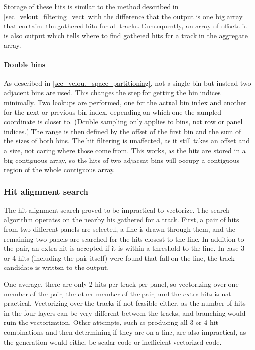 \documentclass[12pt]{article}
\begin{document}
Storage of these hits is similar to the method described in \ref{sec_velout_filtering_vect} with the difference that the output is one big array that contains the gathered hits for all tracks. Consequently, an array of offsets is is also output which tells where to find gathered hits for a track in the aggregate array.

\paragraph{Double bins}\mbox{}\vspace{0.4pc}

As described in \ref{sec_velout_space_partitioning}, not a single bin but instead two adjacent bins are used. This changes the step for getting the bin indices minimally. Two lookups are performed, one for the actual bin index and another for the next or previous bin index, depending on which one the sampled coordinate is closer to. (Double sampling only applies to bins, not row or panel indices.) The range is then defined by the offset of the first bin and the sum of the sizes of both bins. The hit filtering is unaffected, as it still takes an offset and a size, not caring where those come from. This works, as the hits are stored in a big contiguous array, so the hits of two adjacent bins will occupy a contiguous region of the whole contiguous array.


\subsubsection{Hit alignment search}

The hit alignment search proved to be impractical to vectorize. The search algorithm operates on the nearby his gathered for a track. First, a pair of hits from two different panels are selected, a line is drawn through them, and the remaining two panels are searched for the hits closest to the line. In addition to the pair, an extra hit is accepted if it is within a threshold to the line. In case 3 or 4 hits (including the pair itself) were found that fall on the line, the track candidate is written to the output.

One average, there are only 2 hits per track per panel, so vectorizing over one member of the pair, the other member of the pair, and the extra hits is not practical. Vectorizing over the tracks if not feasible either, as the number of hits in the four layers can be very different between the tracks, and branching would ruin the vectorization. Other attempts, such as producing all 3 or 4 hit combinations and then determining if they are on a line, are also impractical, as the generation would either be scalar code or inefficient vectorized code.
\end{document}
